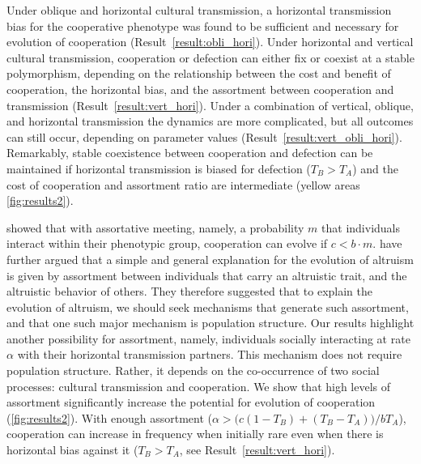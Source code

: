 \documentclass[12pt]{extarticle}
\begin{document}
{Under oblique and horizontal cultural transmission, a horizontal transmission bias for the cooperative phenotype was found to be sufficient and necessary for evolution of cooperation (Result~\autoref{result:obli_hori}).
Under horizontal and vertical cultural transmission, cooperation or defection can either fix or coexist at a stable polymorphism, depending on the relationship between the cost and benefit of cooperation, the horizontal bias, and the assortment between cooperation and transmission (Result~\autoref{result:vert_hori}).
Under a combination of vertical, oblique, and horizontal transmission the dynamics are more complicated, but all outcomes can still occur, depending on parameter values (Result~\autoref{result:vert_obli_hori}).
Remarkably, stable coexistence between cooperation and defection can be maintained if horizontal transmission is biased for defection ($T_B>T_A$) and the cost of cooperation and assortment ratio are intermediate (yellow areas \autoref{fig:results2}).

\citet{Eshel1982} showed that with assortative meeting, namely, a probability $m$ that individuals interact  within their phenotypic group, cooperation can evolve if $c < b \cdot m$.
\citet{Fletcher2009assortment} have further argued that a simple and general explanation for the evolution of altruism is given by assortment between individuals that carry an altruistic trait, and the altruistic behavior of others.
They therefore suggested that to explain the evolution of altruism, we should seek mechanisms that generate such assortment, and that one such major mechanism is population structure.
Our results highlight another possibility for assortment, namely, individuals socially interacting at rate $\alpha$ with their horizontal transmission partners. This mechanism does not require population structure. Rather, it depends on the co-occurrence of two social processes: cultural transmission and cooperation.
We show that high levels of assortment significantly increase the potential for evolution of cooperation (\autoref{fig:results2}).
With enough assortment ($\alpha > \big(c(1-T_B) + (T_B-T_A)\big) / b T_A$), cooperation can increase in frequency when initially rare even when there is horizontal bias against it ($T_B>T_A$, see Result~\autoref{result:vert_hori}).

}
\end{document}
